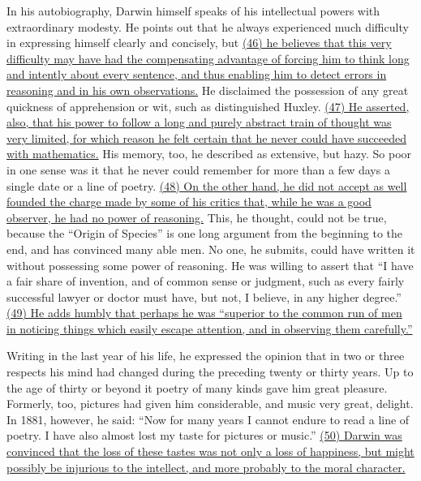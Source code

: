 
\qquad In his autobiography, Darwin himself speaks of his intellectual powers with extraordinary modesty. He points out that he always experienced much difficulty in expressing himself clearly and concisely, but \ul{(46) he believes that this very difficulty may have had the compensating advantage of forcing him to think long and intently about every sentence, and thus enabling him to detect errors in reasoning and in his own observations.} He disclaimed the possession of any great quickness of apprehension or wit, such as distinguished Huxley. \ul{(47) He asserted, also, that his power to follow a long and purely abstract train of thought was very limited, for which reason he felt certain that he never could have succeeded with mathematics.} His memory, too, he described as extensive, but hazy. So poor in one sense was it that he never could remember for more than a few days a single date or a line of poetry. \ul{(48) On the other hand, he did not accept as well founded the charge made by some of his critics that, while he was a good observer, he had no power of reasoning.} This, he thought, could not be true, because the ``Origin of Species'' is one long argument from the beginning to the end, and has convinced many able men. No one, he submits, could have written it without possessing some power of reasoning. He was willing to assert that ``I have a fair share of invention, and of common sense or judgment, such as every fairly successful lawyer or doctor must have, but not, I believe, in any higher degree.'' \ul{(49) He adds humbly that perhaps he was ``superior to the common run of men in noticing things which easily escape attention, and in observing them carefully.''}

\qquad Writing in the last year of his life, he expressed the opinion that in two or three respects his mind had changed during the preceding twenty or thirty years. Up to the age of thirty or beyond it poetry of many kinds gave him great pleasure. Formerly, too, pictures had given him considerable, and music very great, delight. In 1881, however, he said: ``Now for many years I cannot endure to read a line of poetry. I have also almost lost my taste for pictures or music.'' \ul{(50) Darwin was convinced that the loss of these tastes was not only a loss of happiness, but might possibly be injurious to the intellect, and more probably to the moral character.}